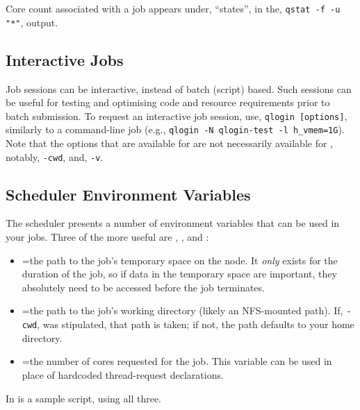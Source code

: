 \documentclass{easychair}
\begin{document}
Core count associated with a job appears under, ``states'', in the,
\texttt{qstat -f -u "*"}, output.

\subsection{Interactive Jobs}

Job sessions can be interactive, instead of batch (script) based. Such 
sessions can be useful for testing and optimising code and resource 
requirements prior to batch submission. To request an interactive job 
session, use, \texttt{qlogin [options]}, similarly to a 
 command-line job (e.g., \texttt{qlogin -N qlogin-test -l h\_vmem=1G}).
Note that the options that are available for  are not necessarily
available for , notably, \texttt{-cwd}, and, \texttt{-v}. 

\subsection{Scheduler Environment Variables}

The scheduler presents a number of environment variables that can be used in 
your jobs. Three of the more useful are , , 
and :

\begin{itemize}
\item
{}=the path to the job's temporary space on the node. It
\emph{only} exists for the duration of the job, so if data in the temporary space 
are important, they absolutely need to be accessed before the job terminates.

\item
{}=the path to the job's working directory (likely an
NFS-mounted path). If, \texttt{-cwd}, was stipulated, that path is taken; if not, 
the path defaults to your home directory.

\item
{}=the number of cores requested for the job. This variable can 
be used in place of hardcoded thread-request declarations. 

\end{itemize}

\noindent
In  is a sample script, using all three.
\end{document}
